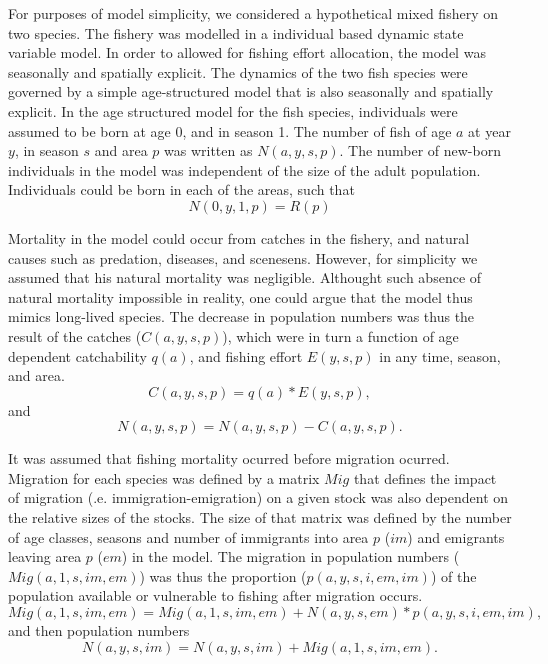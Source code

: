 \documentclass[12pt,oneline,a4paper,numbib]{ouparticle}
\numberwithin{equation}{subsection} %
\begin{document}
For purposes of model simplicity, we considered a hypothetical mixed fishery on two species. The fishery was modelled in a individual based dynamic state variable model. In order to allowed for fishing effort allocation, the model was seasonally and spatially explicit. The dynamics of the two fish species were governed by a simple age-structured model that is also seasonally and spatially explicit. In the age structured model for the fish species, individuals were assumed to be born at age 0, and in season 1. The number of fish of age $a$ at year $y$, in season $s$ and area $p$ was written as $N (a, y, s, p)$. The number of new-born individuals in the model was independent of the size of the adult population. Individuals could be born in each of the areas, such that  
\begin{equation}
N (0, y, 1, p) = R (p)
\end{equation}

Mortality in the model could occur from catches in the fishery, and natural causes such as predation, diseases, and scenesens. However, for simplicity we assumed that his natural mortality was negligible. Althought such absence of natural mortality impossible in reality, one could argue that the model thus mimics long-lived species. The decrease in population numbers was thus the result of the catches ($C (a, y, s, p)$), which were in turn a function of age dependent catchability $q(a)$, and fishing effort $E (y,s,p)$ in any time, season, and area. 
\begin{equation}
C (a, y, s, p) = q(a) * E(y,s,p),
\end{equation}
and 
\begin{equation}
N (a, y, s, p) = N (a, y, s, p) - C (a, y, s, p). 
\end{equation}

It was assumed that fishing mortality ocurred before migration ocurred. Migration for each species was defined by a matrix $Mig$ that defines the impact of migration (.e. immigration-emigration) on a given stock was also dependent on the relative sizes of the stocks. The size of that matrix  was defined by the number of age classes, seasons and number of immigrants into area $p$ ($im$) and emigrants leaving area $p$ ($em$) in the model. The migration in population numbers ($Mig (a, 1, s, im, em)$) was thus the proportion ($p (a, y, s, i, em, im)$) of the population available or vulnerable to fishing after migration occurs.   
\begin{equation}
Mig (a, 1, s, im, em) = Mig(a, 1, s, im, em) + N (a, y, s, em) * p (a, y, s, i, em, im),
\end{equation}
and then population numbers
\begin{equation}
N (a, y, s, im) = N (a, y, s, im) +  Mig (a, 1, s, im, em).
\end{equation}
\end{document}
